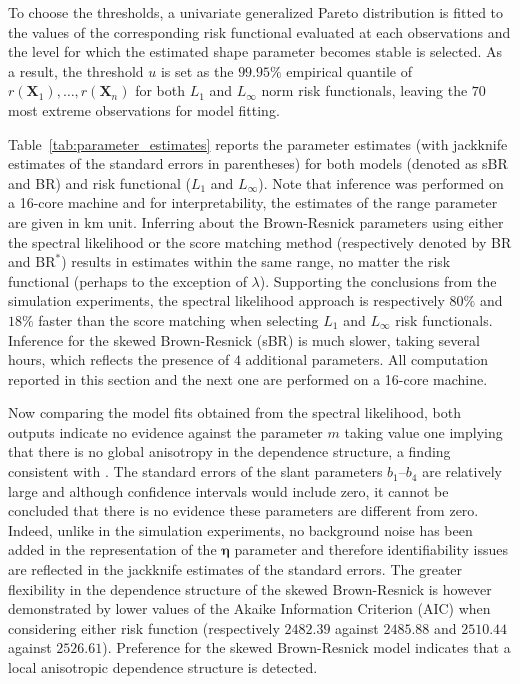 \documentclass[12pt]{article}
\begin{document}
%
To choose the thresholds, a univariate generalized Pareto distribution is fitted to the values of the corresponding risk functional evaluated at each observations and the level for which the estimated shape parameter becomes stable is selected. 
%
As a result, the threshold $u$ is set as the $99.95\%$ empirical quantile of $r(\bm X_1),\dots,r(\bm X_n)$ for both $L_1$ and $L_\infty$ norm risk functionals, leaving the $70$ most extreme observations for model fitting. 
%
% 

Table~\ref{tab:parameter_estimates} reports the parameter estimates (with jackknife estimates of the standard errors in parentheses) for both models (denoted as sBR and BR) and risk functional ($L_1$ and $L_\infty$). Note that inference was performed on a 16-core machine and for interpretability, the estimates of the range parameter are given in km unit.
%
Inferring about the Brown-Resnick parameters using either the spectral likelihood or the score matching method (respectively denoted by BR and $\textrm{BR}^*$) results in estimates within the same range, no matter the risk functional (perhaps to the exception of $\lambda$). Supporting the conclusions from the simulation experiments, the spectral likelihood approach is respectively $80\%$ and $18\%$ faster than the score matching when selecting $L_1$ and $L_\infty$ risk functionals. 
%
Inference for the skewed Brown-Resnick (sBR) is much slower, taking several hours, which reflects the presence of $4$ additional parameters. All computation reported in this section and the next one are performed on a 16-core machine.

Now comparing the model fits obtained from the spectral likelihood, both outputs indicate no evidence against the parameter $m$ taking value one implying that there is no global anisotropy in the dependence structure, a finding consistent with \cite{deFondeville.Davison:2018}. 
%
The standard errors of the slant parameters $b_1$--$b_4$ are relatively large and although confidence intervals would include zero, it cannot be concluded that there is no evidence these parameters are different from zero. Indeed, unlike in the simulation experiments, no background noise has been added in the representation of the $\bm \eta$ parameter and therefore identifiability issues are reflected in the jackknife estimates of the standard errors.
%
The greater flexibility in the dependence structure of the skewed Brown-Resnick is however demonstrated by lower values of the Akaike Information Criterion (AIC) when considering either risk function (respectively $2482.39$ against $2485.88$ and $2510.44$ against $2526.61$). Preference for the skewed Brown-Resnick model indicates that a local anisotropic dependence structure is detected.
\end{document}

